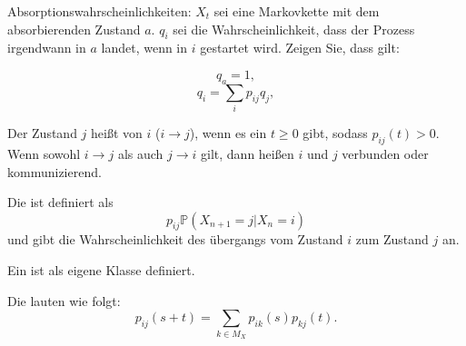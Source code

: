 \begin{uebsp}
\begin{Exercise}[label=ex:4.2]
Absorptionswahrscheinlichkeiten: $X_t$ sei eine Markovkette mit dem absorbierenden Zustand $a$. $q_i$ sei die Wahrscheinlichkeit, dass der Prozess irgendwann in $a$ landet, wenn in $i$ gestartet wird. Zeigen Sie, dass gilt:

\[q_a=1,\]
\[q_i=\sum_ip_{ij}q_j,\]
\end{Exercise}
\begin{Answer}
\begin{uebsp_theory}
    Der Zustand $j$ heißt  von $i$ ($i\rightarrow j$), wenn es ein $t\ge 0$ gibt, sodass $p_{ij}(t)>0$.\\
    Wenn sowohl $i\rightarrow j$ als auch $j\rightarrow i$ gilt, dann heißen $i$ und $j$ verbunden oder kommunizierend.
\end{uebsp_theory}

\begin{uebsp_theory}
    Die  ist definiert als \[p_{ij}\mathbb P(X_{n+1}=j|X_n=i)\] und gibt die Wahrscheinlichkeit des übergangs vom Zustand $i$ zum Zustand $j$ an. 
\end{uebsp_theory}

\begin{uebsp_theory}
    Ein  ist als eigene Klasse definiert.
\end{uebsp_theory}

\begin{uebsp_theory}
    Die  lauten wie folgt:
    \[p_{ij}(s+t)=\sum_{k\in M_X}p_{ik}(s)p_{kj}(t).\]
\end{uebsp_theory}


\end{Answer}
\end{uebsp}
